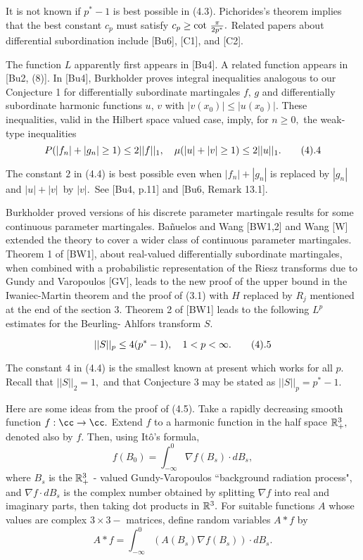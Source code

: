 It is not known if $p^* - 1$ is best possible in (4.3). Pichorides's theorem 
implies that the best constant $c_p$ must satisfy $c_p\geq \cot\,{{\pi}\over 
{2p^*}}.$ Related papers about differential subordination include [Bu6], 
[C1], and [C2].  

The function $L$ apparently first appears in [Bu4]. A related function 
appears in [Bu2, (8)]. In [Bu4], Burkholder proves  
integral inequalities analogous to our Conjecture 1 for differentially 
subordinate martingales 
$f,\,g$ and differentially subordinate harmonic functions $u,\,v$ with 
$|v(x_0)|\leq |u(x_0)|.$  These inequalities, valid in the Hilbert space valued 
case, imply, for $n\geq 0,$ the weak-type inequalities
$$P(|f_n| + |g_n|\geq 1) \leq 2||f||_1,\quad \mu(|u| + |v| \geq 1)\leq 
2||u||_1.\tag4.4$$

The constant $2$ in (4.4) is best possible even when $|f_n| + |g_n|$ is 
replaced by $|g_n|\,$ and $|u| + |v|\,$ by $|v|.\,$ See [Bu4, p.11] and  [Bu6, 
Remark 13.1].

Burkholder proved versions of his discrete parameter martingale 
results for some continuous parameter martingales. Ba\~nuelos and Wang [BW1,2] 
and Wang [W] extended the theory to cover a wider class of
continuous parameter martingales. Theorem 1 of [BW1], about real-valued 
differentially subordinate martingales, when combined with a probabilistic 
representation of the Riesz transforms due to Gundy and Varopoulos [GV], 
leads to the new proof of the upper bound in the Iwaniec-Martin theorem and 
the proof of (3.1)  
with $H$ replaced by $R_j$ mentioned at the end of the section 3.  
Theorem 2 of [BW1] leads to the following $L^p$ estimates for the Beurling-
Ahlfors transform $S.$

 $$||S||_p \leq 4(p^* - 1),\quad 
1<p<\infty.\tag4.5$$ \endproclaim 

The constant 4 in (4.4) is the smallest known at present which works for all 
$p.$ Recall that  $||S||_2 = 1,$ and that Conjecture 3 may be stated as 
$||S||_p = p^* - 1.$ 

Here are some ideas from the proof of (4.5). Take a 
rapidly decreasing smooth function $f:\cc \rightarrow \cc.$ Extend $f$ 
to a harmonic function in the  half space ${\Bbb R}_+^3,$ denoted also by $f.$  
Then, using It\^o's formula,
$$f(B_0) = \int_{-\infty}^0 \nabla f(B_s)\cdot dB_s,$$
where $B_s$ is the ${\Bbb R}_+^3$ - valued Gundy-Varopoulos ``background 
radiation process",   and $\nabla f \cdot dB_s$ is the complex number obtained by 
splitting $\nabla f$ into real and imaginary parts, then taking dot products 
in ${\Bbb R}^3.$ For suitable functions $A$ whose values are complex $3\times 3-$ 
matrices, define random variables $A*f$ by 
$$A*f = \int_{-\infty}^0 (A(B_s) \nabla f(B_s))\cdot dB_s.$$ 

